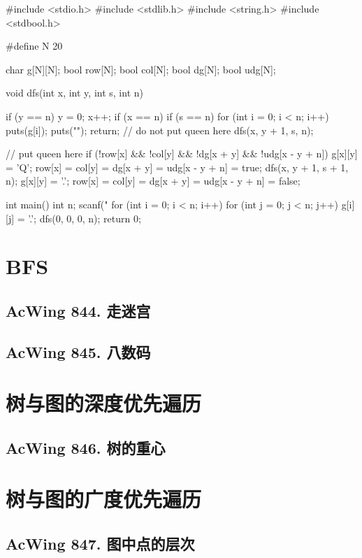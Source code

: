 \begin{mycpptwocol}
#include <stdio.h>
#include <stdlib.h>
#include <string.h>
#include <stdbool.h>

#define N 20

char g[N][N];
bool row[N];
bool col[N];
bool dg[N];
bool udg[N];

void dfs(int x, int y, int s, int n)
{
    if (y == n) {
        y = 0;
        x++;
    }
    if (x == n) {
        if (s == n) {
            for (int i = 0; i < n; i++) {
                puts(g[i]);
            }
            puts("");
        }
        return;
    }
    // do not put queen here
    dfs(x, y + 1, s, n);

    // put queen here
    if (!row[x] && !col[y] && !dg[x + y] && !udg[x - y + n]) {
        g[x][y] = 'Q';
        row[x] = col[y] = dg[x + y] = udg[x - y + n] = true;
        dfs(x, y + 1, s + 1, n);
        g[x][y] = '.';
        row[x] = col[y] = dg[x + y] = udg[x - y + n] = false;
    }
}

int main()
{
    int n;
    scanf("%
    for (int i = 0; i < n; i++) {
        for (int j = 0; j < n; j++) {
            g[i][j] = '.';
        }
    }
    dfs(0, 0, 0, n);
    return 0;
}

\section{BFS}
\subsection{AcWing 844. 走迷宫}
\subsection{AcWing 845. 八数码}

\section{树与图的深度优先遍历}
\subsection{AcWing 846. 树的重心}

\section{树与图的广度优先遍历}
\subsection{AcWing 847. 图中点的层次}


\end{mycpptwocol}
